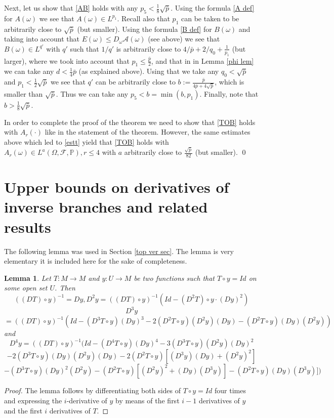 \documentclass[11pt,reqno,a4paper]{article}
\newtheorem{lemma}[theorem]{Lemma}
\theoremstyle{special}
\def\om{\omega}
\begin{document}
Next, let us show that \eqref{AB} holds with any $p_5<\frac18\sqrt{\bar p}$. Using the formula \eqref{A def}  for $A(\om)$ we see that $A(\om)\in L^{p_1}$. Recall also that $p_1$ can be taken to be arbitrarily close to $\sqrt{\bar p}$ (but smaller).  Using the formula \eqref{B def} for $B(\om)$ and taking into account that $E(\om)\leq D_\om \mathcal A(\om)$ (see above) 
we see that $B(\om)\in L^{q'}$ with $q'$ such that $1/q'$ is arbitrarily close to $4/\bar p+2/q_0+\frac{1}{p_1}$ (but larger),   where we took into account that $p_1\leq \frac{\bar p}2$, and that in
in Lemma \ref{phi lem} we can take any $d<\frac14\bar p$ (as explained above). Using  that we take any $q_0<\sqrt{\bar p}$ and $p_1<\frac12\sqrt{\bar p}$  we see that $q'$ can be arbitrarily close to $b:=\frac{\bar p}{4\bar p+4\sqrt{\bar p}}$, which is smaller than $\sqrt {\bar p}$. Thus we can take any $p_5<b=\min(b,p_1)$. Finally, note that $b>\frac1{8}\sqrt{\bar p}$.

In order to complete the proof of the theorem we need to show that \eqref{TOB} holds with $A_r(\cdot)$ like in the statement of the theorem. However, the same estimates above which led to \eqref{estt} yield that \eqref{TOB} 
holds with $A_r(\om)\in L^a(\Omega,\mathcal F,\mathbb P), r\leq 4$ with $a$ arbitrarily close to $\frac{\sqrt{\bar p}}{82}$ (but smaller).
\qed


\appendix
\section{Upper bounds on derivatives of inverse branches and related results}\label{App A}

The following lemma was used in Section \ref{top ver sec}. The lemma is very elementary it is included here for the sake of completeness.
\begin{lemma}\label{Der lemma}
Let $T:M\to M$ and $y:U\to M$ be two functions such that $T\circ y=Id$ on some open set $U$. 
Then
$$
((DT)\circ y)^{-1}=Dy,
D^2y=((DT)\circ y)^{-1}\left(Id-
(D^2 T)\circ y\cdot (Dy)^2\right)
$$
$$
D^3y
$$
$$
=((DT)\circ y)^{-1}\left(Id-(D^3 T\circ y)(Dy)^3-2(D^2 T\circ y)(D^2y) (Dy)-(D^2 T\circ y)(Dy)(D^2y)\right)
$$
and
$$
D^4y=((DT)\circ y)^{-1}\Big(Id-(D^4T\circ y)(Dy)^4-3(D^3 T\circ y)(D^2y)(Dy)^2
$$
$$
-2(D^3T\circ y)(Dy)(D^2y)(Dy)-2(D^2T\circ y)[(D^3y)(Dy)+(D^2y)^2]
$$
$$
-(D^3 T\circ y)(Dy)^2(D^2y)-(D^2T\circ y)[(D^2y)^2+(Dy)(D^3y)]-(D^2T\circ y)(Dy)(D^3y)]\Big)
$$
\end{lemma}

\begin{proof}
The lemma follows by differentiating both sides of $T\circ y=Id$ four times and expressing the $i$-derivative of $y$ by means of the first $i-1$ derivatives of $y$ and the first $i$ derivatives of $T$.    
\end{proof}
\end{document}
